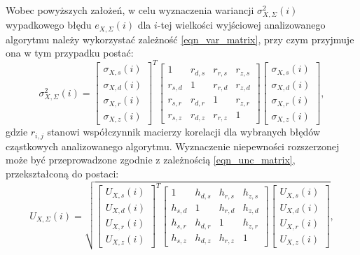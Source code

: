 Wobec powyższych założeń, w celu wyznaczenia wariancji $\sigma_{X,\Sigma}^{2}(i)$ wypadkowego błędu $e_{X,\Sigma}(i)$ dla $i$-tej wielkości wyjściowej analizowanego algorytmu należy wykorzystać zależność \eqref{eqn_var_matrix}, przy czym przyjmuje ona w tym przypadku postać:
\begin{equation}
\sigma_{X,\Sigma}^{2} \left( i \right) =
\begin{bmatrix}
\sigma_{X,s} \left( i \right) \\ \sigma_{X,d} \left( i \right) \\ \sigma_{X,r} \left( i \right) \\ \sigma_{X,z} \left( i \right)
\end{bmatrix}^{T}
\begin{bmatrix}
1         & r_{d,s} & r_{r,s} & r_{z,s} \\
r_{s,d}   & 1       & r_{r,d} & r_{z,d} \\
r_{s,r}   & r_{d,r} & 1       & r_{z,r} \\
r_{s,z}   & r_{d,z} & r_{r,z} & 1
\end{bmatrix}
\begin{bmatrix}
\sigma_{X,s} \left( i \right) \\ \sigma_{X,d} \left( i \right) \\ \sigma_{X,r} \left( i \right) \\ \sigma_{X,z} \left( i \right)
\end{bmatrix}
\label{eqn_alg_outvar_mat},
\end{equation}
gdzie $r_{i,j}$ stanowi współczynnik macierzy korelacji dla wybranych błędów cząstkowych analizowanego algorytmu. Wyznaczenie niepewności rozszerzonej może być przeprowadzone zgodnie z zależnością \eqref{eqn_unc_matrix}, przekształconą do postaci:
\begin{equation}
U_{X,\Sigma} \left( i \right) = \sqrt{
\begin{bmatrix}
U_{X,s} \left( i \right) \\ U_{X,d} \left( i \right) \\ U_{X,r} \left( i \right) \\ U_{X,z} \left( i \right)
\end{bmatrix}^{T}
\begin{bmatrix}
1         & h_{d,s} & h_{r,s} & h_{z,s} \\
h_{s,d}   & 1       & h_{r,d} & h_{z,d} \\
h_{s,r}   & h_{d,r} & 1       & h_{z,r} \\
h_{s,z}   & h_{d,z} & h_{r,z} & 1
\end{bmatrix}
\begin{bmatrix}
U_{X,s} \left( i \right) \\ U_{X,d} \left( i \right) \\ U_{X,r} \left( i \right) \\ U_{X,z} \left( i \right)
\end{bmatrix}}
\label{eqn_alg_outunc_mat},
\end{equation}
